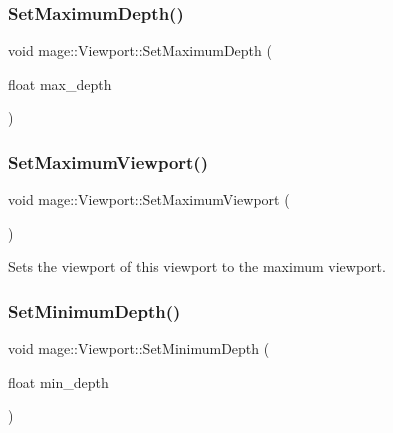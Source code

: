 \hypertarget{structmage_1_1_viewport_a2dedffd83e06c7d0c05021a4d1cb8923}{}\label{structmage_1_1_viewport_a2dedffd83e06c7d0c05021a4d1cb8923} 
\subsubsection{\texorpdfstring{Set\+Maximum\+Depth()}{SetMaximumDepth()}}
{\footnotesize\ttfamily void mage\+::\+Viewport\+::\+Set\+Maximum\+Depth (\begin{DoxyParamCaption}\item[{float}]{max\+\_\+depth }\end{DoxyParamCaption})\hspace{0.3cm}{\ttfamily [noexcept]}}

\hypertarget{structmage_1_1_viewport_a5af006b8ec0464a924c3822265727ee2}{}\label{structmage_1_1_viewport_a5af006b8ec0464a924c3822265727ee2} 
\subsubsection{\texorpdfstring{Set\+Maximum\+Viewport()}{SetMaximumViewport()}}
{\footnotesize\ttfamily void mage\+::\+Viewport\+::\+Set\+Maximum\+Viewport (\begin{DoxyParamCaption}{ }\end{DoxyParamCaption})\hspace{0.3cm}{\ttfamily [noexcept]}}

Sets the viewport of this viewport to the maximum viewport. \hypertarget{structmage_1_1_viewport_ad6984669ee7837b1c4cfa901a829e867}{}\label{structmage_1_1_viewport_ad6984669ee7837b1c4cfa901a829e867} 
\subsubsection{\texorpdfstring{Set\+Minimum\+Depth()}{SetMinimumDepth()}}
{\footnotesize\ttfamily void mage\+::\+Viewport\+::\+Set\+Minimum\+Depth (\begin{DoxyParamCaption}\item[{float}]{min\+\_\+depth }\end{DoxyParamCaption})\hspace{0.3cm}{\ttfamily [noexcept]}}

